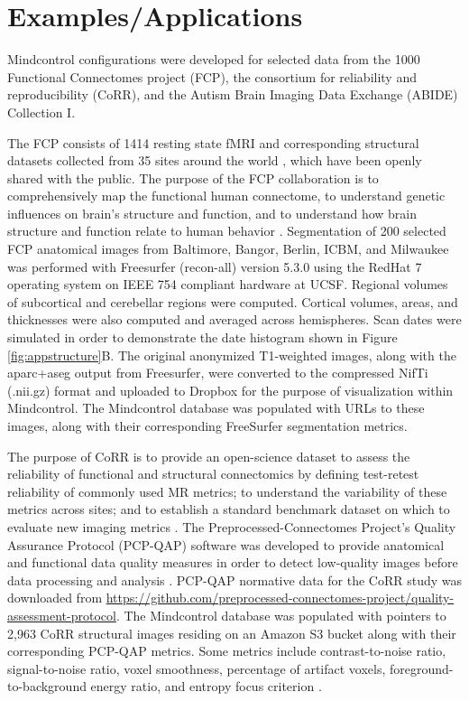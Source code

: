 \section{Examples/Applications}

Mindcontrol configurations were developed for selected data from the 1000 Functional Connectomes project (FCP), the consortium for reliability and reproducibility (CoRR), and the Autism Brain Imaging Data Exchange (ABIDE) Collection I. 

The FCP consists of 1414 resting state fMRI and corresponding structural datasets collected from 35 sites around the world  \cite{biswal2010toward}, which have been openly shared with the public. The purpose of the FCP collaboration is to comprehensively map the functional human connectome, to understand genetic influences on brain's structure and function, and to understand how brain structure and function relate to human behavior \cite{biswal2010toward}. Segmentation of 200 selected FCP anatomical images from Baltimore, Bangor, Berlin, ICBM, and Milwaukee was performed with Freesurfer (recon-all) version 5.3.0 \cite{fischl2002whole} using the RedHat 7 operating system on IEEE 754 compliant hardware at UCSF. Regional volumes of  subcortical and cerebellar regions were computed. Cortical volumes, areas, and thicknesses were also computed and averaged across hemispheres. Scan dates were simulated in order to demonstrate the date histogram shown in Figure \ref{fig:appstructure}B. The original anonymized T1-weighted images, along with the aparc+aseg output from Freesurfer, were converted to the compressed NifTi (.nii.gz) format and uploaded to Dropbox for the purpose of visualization within Mindcontrol. The Mindcontrol database was populated with URLs to these images, along with their corresponding FreeSurfer segmentation metrics.

The purpose of CoRR is to provide an open-science dataset to assess the reliability of functional and structural connectomics by defining test-retest reliability of commonly used MR metrics; to understand the variability of these metrics across sites; and to establish a standard benchmark dataset on which to evaluate new imaging metrics \cite{Zuo_2014}. The Preprocessed-Connectomes Project's Quality Assurance Protocol (PCP-QAP) software was developed to provide anatomical and functional data quality measures in order to detect low-quality images before data processing and analysis \cite{shehzadpreprocessed}. PCP-QAP normative data for the CoRR study was downloaded from \href{http://raw.githubusercontent.com/preprocessed-connectomes-project/quality-assessment-protocol/master/poster_data/corr_anat.csv}{https://github.com/preprocessed-connectomes-project/quality-assessment-protocol}. The Mindcontrol database was populated with pointers to 2,963 CoRR structural images residing on an Amazon S3 bucket along with their corresponding PCP-QAP metrics. Some metrics include contrast-to-noise ratio, signal-to-noise ratio, voxel smoothness, percentage of artifact voxels, foreground-to-background energy ratio, and entropy focus criterion \cite{shehzadpreprocessed}. 

